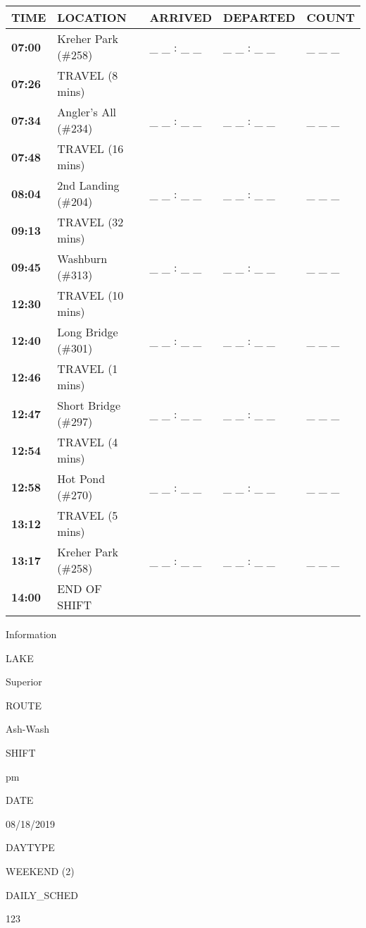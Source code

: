 \documentclass[]{article}
\begin{document}
\begin{tabular}{>{\bfseries}lllll}
\toprule
\textbf{TIME} & \textbf{LOCATION} & \textbf{ARRIVED} & \textbf{DEPARTED} & \textbf{COUNT}\\
\midrule
07:00 & Kreher Park (\#258) & \_ \_ : \_ \_ & \_ \_ : \_ \_ & \_ \_ \_\\
07:26 & TRAVEL (8 mins) &  &  & \\
07:34 & Angler's All (\#234) & \_ \_ : \_ \_ & \_ \_ : \_ \_ & \_ \_ \_\\
07:48 & TRAVEL (16 mins) &  &  & \\
08:04 & 2nd Landing (\#204) & \_ \_ : \_ \_ & \_ \_ : \_ \_ & \_ \_ \_\\
09:13 & TRAVEL (32 mins) &  &  & \\
09:45 & Washburn (\#313) & \_ \_ : \_ \_ & \_ \_ : \_ \_ & \_ \_ \_\\
12:30 & TRAVEL (10 mins) &  &  & \\
12:40 & Long Bridge (\#301) & \_ \_ : \_ \_ & \_ \_ : \_ \_ & \_ \_ \_\\
12:46 & TRAVEL (1 mins) &  &  & \\
12:47 & Short Bridge (\#297) & \_ \_ : \_ \_ & \_ \_ : \_ \_ & \_ \_ \_\\
12:54 & TRAVEL (4 mins) &  &  & \\
12:58 & Hot Pond (\#270) & \_ \_ : \_ \_ & \_ \_ : \_ \_ & \_ \_ \_\\
13:12 & TRAVEL (5 mins) &  &  & \\
13:17 & Kreher Park (\#258) & \_ \_ : \_ \_ & \_ \_ : \_ \_ & \_ \_ \_\\
14:00 & END OF SHIFT &  &  & \\
\bottomrule
\end{tabular}\newpage

Information

LAKE

Superior

ROUTE

Ash-Wash

SHIFT

pm

DATE

08/18/2019

DAYTYPE

WEEKEND (2)

DAILY\_SCHED

123

\vspace{24pt}
\end{document}
